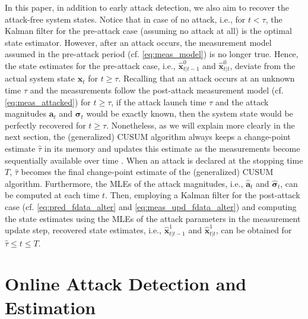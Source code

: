 \documentclass[onecolumn]{IEEEtran}
\begin{document}
In this paper, in addition to early attack detection, we also aim to recover the attack-free system states. Notice that in case of no attack, i.e., for $t < \tau$, the Kalman filter for the pre-attack case (assuming no attack at all) is the optimal state estimator. However, after an attack occurs, the measurement model assumed in the pre-attack period (cf. \eqref{eq:meas_model}) is no longer true. Hence, the state estimates for the pre-attack case, i.e., $\hat{\mathbf{x}}_{t|t-1}^0$ and $\hat{\mathbf{x}}_{t|t}^0$, deviate from the actual system state $\mathbf{x}_t$ for $t \geq \tau$. Recalling that an attack occurs at an unknown time $\tau$ and the measurements follow the post-attack measurement model (cf. \eqref{eq:meas_attacked}) for $t \geq \tau$, if the attack launch time $\tau$ and the attack magnitudes $\mathbf{a}_t$ and $\pmb{\sigma}_t$ would be exactly known, then the system state would be perfectly recovered for $t \geq \tau$. Nonetheless, as we will explain more clearly in the next section, the (generalized) CUSUM algorithm always keeps a change-point estimate $\hat{\tau}$ in its memory and updates this estimate as the measurements become sequentially available over time \cite[Sec. 2.2]{Basseville93}. When an attack is declared at the stopping time $T$, $\hat{\tau}$ becomes the final change-point estimate of the (generalized) CUSUM algorithm. Furthermore, the MLEs of the attack magnitudes, i.e., $\hat{\mathbf{a}}_t$ and $\hat{\pmb{\sigma}}_t$, can be computed at each time $t$. Then, employing a Kalman filter for the post-attack case (cf. \eqref{eq:pred_fdata_alter} and \eqref{eq:meas_upd_fdata_alter}) and computing the state estimates using the MLEs of the attack parameters in the measurement update step, recovered state estimates, i.e., $\hat{\mathbf{x}}_{t|t-1}^1$ and $\hat{\mathbf{x}}_{t|t}^1$, can be obtained for $\hat{\tau} \leq t \leq T$.

\section{Online Attack Detection and Estimation} \label{sec:combined}
\end{document}
